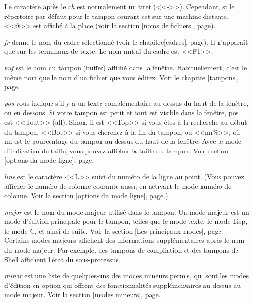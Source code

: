 Le caractère après le \emph{ch} est normalement un tiret (<<->>). Cependant,
si le répertoire par défaut pour le tampon courant est sur une machine
distante, <<@>> est affiché à la place (voir la
section [noms de fichiers],
page). \par

\emph{fr} donne le nom du cadre sélectionné (voir le
chapitre[cadres], page). Il n'apparaît
que sur les terminaux de texte. Le nom initial du cadre est
<<F1>>.\par 

\emph{buf} est le nom du tampon (buffer) affiché dans la
fenêtre. Habituellement, c'est le même nom que le nom d'un fichier que
vous éditez. Voir le chapitre [tampons],
page.\par  

\emph{pos} vous indique s'il y a un texte complémentaire au-dessus du haut de
la fenêtre, ou en dessous. Si votre tampon est petit et tout est
visible dans la fenêtre, pos est <<Tout>> (all). Sinon, il est <<Top>>
si vous êtes à la recherche au début du tampon, <<Bot>> si vous
cherchez à la fin du tampon, ou <<nn\%>>, où nn est le pourcentage du
tampon au-dessus du haut de la fenêtre. Avec le mode d'indication de
taille, vous pouvez afficher la taille du tampon. Voir
section [options du mode ligne],
page.\par 

\emph{line} est le caractère <<L>> suivi du numéro de la ligne au
point. (Vous pouvez afficher le numéro de colonne courante aussi, en
activant le mode numéro de colonne. Voir la section
[options du mode ligne], page.) \par

\emph{major} est le nom du mode majeur utilisé dans le tampon. Un mode
majeur est un mode d'édition principale pour le tampon, telles que le
mode texte, le mode Lisp, le mode C, et ainsi de suite. Voir la
section [Les principaux modes],
page. Certains modes majeurs affichent des
informations supplémentaires après le nom du mode majeur. Par exemple,
des tampons de compilation et des tampons de Shell affichent l'état du
sous-processus. \par 

\emph{minor} est une liste de quelques-uns des modes mineurs permis,
qui sont les modes d'édition en option qui offrent des fonctionnalités
supplémentaires au-dessus du mode majeur. Voir la
section [modes mineurs],
page. \par

